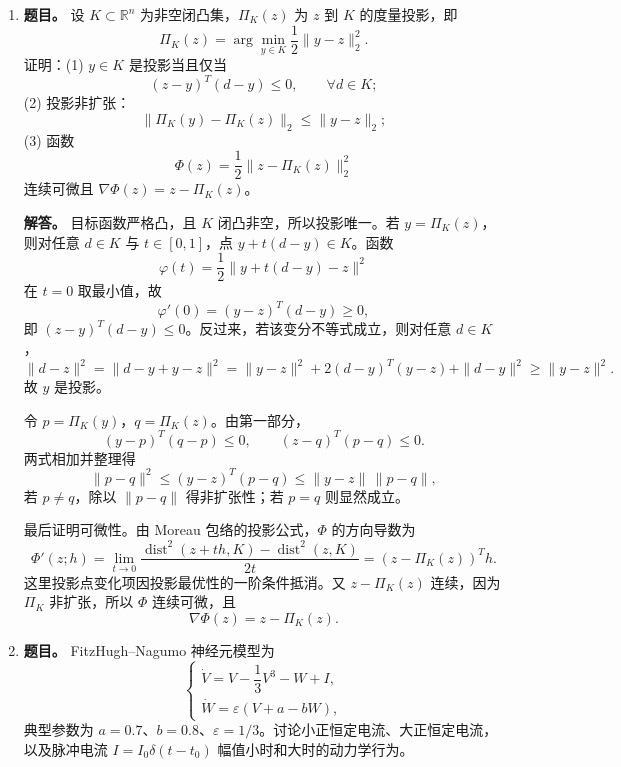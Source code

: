 ﻿\documentclass[UTF8,12pt]{ctexart}
\begin{document}
\begin{enumerate}[label=\textbf{\arabic*.},leftmargin=2.2em]
作 von Neumann 分析，令 \(u_j^n=G^n e^{ij\theta}\)，\(r=k/h^2\)。格式给出
\[
\frac{G-G^{-1}}{2k}=-\frac{4}{h^2}\sin^2\frac\theta2,
\]
即
\[
G^2+8r\sin^2\frac\theta2\,G-1=0.
\]
两根乘积为 \(-1\)，故除非根都在单位圆上且模为 \(1\)（这里不可能），必有一根模大于 \(1\)。因此该格式对任意 \(r>0\) 都不稳定。

把左端改为后向 Euler 差分，得到全隐格式
\[
\frac{u_j^{n+1}-u_j^n}{k}
=\frac{u_{j-1}^{n+1}-2u_j^{n+1}+u_{j+1}^{n+1}}{h^2}.
\]
Fourier 代入得
\[
G=\frac{1}{1+4r\sin^2(\theta/2)},
\]
显然 \(|G|\le1\) 对所有 \(r>0\) 成立，所以该格式无条件稳定。

\item \textbf{题目。} 设 \(K\subset\mathbb R^n\) 为非空闭凸集，\(\Pi_K(z)\) 为 \(z\) 到 \(K\) 的度量投影，即
\[
\Pi_K(z)=\arg\min_{y\in K}\frac12\|y-z\|_2^2.
\]
证明：(1) \(y\in K\) 是投影当且仅当
\[
(z-y)^T(d-y)\le0,
\qquad \forall d\in K;
\]
(2) 投影非扩张：
\[
\|\Pi_K(y)-\Pi_K(z)\|_2\le\|y-z\|_2;
\]
(3) 函数
\[
\Phi(z)=\frac12\|z-\Pi_K(z)\|_2^2
\]
连续可微且 \(\nabla\Phi(z)=z-\Pi_K(z)\)。

\textbf{解答。} 目标函数严格凸，且 \(K\) 闭凸非空，所以投影唯一。若 \(y=\Pi_K(z)\)，则对任意 \(d\in K\) 与 \(t\in[0,1]\)，点 \(y+t(d-y)\in K\)。函数
\[
\varphi(t)=\frac12\|y+t(d-y)-z\|^2
\]
在 \(t=0\) 取最小值，故
\[
\varphi'(0)=(y-z)^T(d-y)\ge0,
\]
即 \((z-y)^T(d-y)\le0\)。反过来，若该变分不等式成立，则对任意 \(d\in K\)，
\[
\|d-z\|^2=\|d-y+y-z\|^2
=\|y-z\|^2+2(d-y)^T(y-z)+\|d-y\|^2
\ge\|y-z\|^2.
\]
故 \(y\) 是投影。

令 \(p=\Pi_K(y)\)，\(q=\Pi_K(z)\)。由第一部分，
\[
(y-p)^T(q-p)\le0,
\qquad
(z-q)^T(p-q)\le0.
\]
两式相加并整理得
\[
\|p-q\|^2\le (y-z)^T(p-q)\le \|y-z\|\,\|p-q\|,
\]
若 \(p\ne q\)，除以 \(\|p-q\|\) 得非扩张性；若 \(p=q\) 则显然成立。

最后证明可微性。由 Moreau 包络的投影公式，\(\Phi\) 的方向导数为
\[
\Phi'(z;h)=\lim_{t\to0}\frac{\operatorname{dist}^2(z+th,K)-\operatorname{dist}^2(z,K)}{2t}
=(z-\Pi_K(z))^Th.
\]
这里投影点变化项因投影最优性的一阶条件抵消。又 \(z-\Pi_K(z)\) 连续，因为 \(\Pi_K\) 非扩张，所以 \(\Phi\) 连续可微，且
\[
\nabla\Phi(z)=z-\Pi_K(z).
\]

\item \textbf{题目。} FitzHugh--Nagumo 神经元模型为
\[
\begin{cases}
\dot V=V-\dfrac13V^3-W+I,\\
\dot W=\varepsilon(V+a-bW),
\end{cases}
\]
典型参数为 \(a=0.7\)、\(b=0.8\)、\(\varepsilon=1/3\)。讨论小正恒定电流、大正恒定电流，以及脉冲电流 \(I=I_0\delta(t-t_0)\) 幅值小时和大时的动力学行为。


\end{enumerate}
\end{document}
